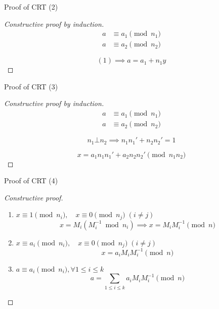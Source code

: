\begin{frame}{Proof of CRT (2)}
  \begin{proof}[Constructive proof by induction]
	\begin{align}
	  a &\equiv a_1 \pmod{n_1} \\
	  a &\equiv a_2 \pmod{n_2}
	\end{align}

	\pause
	\[
	  (1) \implies a = a_1 + n_1 y
	\]
  \end{proof}

\end{frame}
\begin{frame}{Proof of CRT (3)}
  \begin{proof}[Constructive proof by induction]
	\begin{align}
	  a &\equiv a_1 \pmod{n_1} \\
	  a &\equiv a_2 \pmod{n_2}
	\end{align}

	\[
	  n_1 \bot n_2 \implies n_1n_1' + n_2n_2' = 1
	\]

	\pause
	\[
	  x = a_1n_1n_1' + a_2n_2n_2' \pmod{n_1n_2}
	\]
  \end{proof}
\end{frame}
\begin{frame}{Proof of CRT (4)}
  \begin{proof}[Constructive proof]
	\begin{enumerate}[<+->]
	  \item $x \equiv 1 \pmod{n_i}, \quad x \equiv 0 \pmod{n_j}\; (i \neq j)$
		\[
		  x = M_i(M_i^{-1} \bmod n_i) \implies x = M_iM_i^{-1} \pmod{n}
		\]
	  \item $x \equiv a_i \pmod{n_i}, \quad x \equiv 0 \pmod{n_j}\; (i \neq j)$
		\[
		  x = a_i M_iM_i^{-1} \pmod{n}
		\]
	  \item $a \equiv a_i \pmod{n_i}, \forall 1 \le i \le k$
		\[
		  a = \sum_{1 \le i \le k} a_i M_iM_i^{-1} \pmod{n}
		\]
	\end{enumerate}
  \end{proof}
\end{frame}
